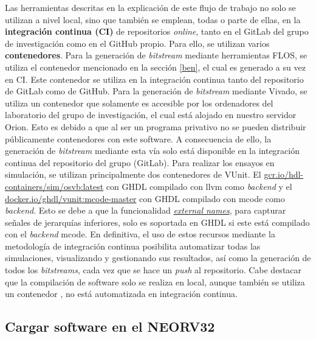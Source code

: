 Las herramientas descritas en la explicación de este flujo de trabajo no solo se utilizan a nivel local, sino que también se emplean, todas o parte de ellas, en la \textbf{integración continua (CI)} de repositorios \textit{online}, tanto en el GitLab del grupo de investigación como en el GitHub propio.
Para ello, se utilizan varios \textbf{contenedores}.
Para la generación de \textit{bitstream} mediante herramientas FLOS, se utiliza el contenedor mencionado en la sección \ref{ben}, el cual es generado a su vez en CI.
Este contenedor se utiliza en la integración continua tanto del repositorio de GitLab como de GitHub.
Para la generación de \textit{bitstream} mediante Vivado, se utiliza un contenedor que solamente es accesible por los ordenadores del laboratorio del grupo de investigación, el cual está alojado en nuestro servidor Orion.
Esto es debido a que al ser un programa privativo no se pueden distribuir públicamente contenedores con este software. A consecuencia de ello, la generación de \textit{bitstream} mediante esta vía solo está disponible en la integración continua del repositorio del grupo (GitLab).
Para realizar los ensayos en simulación, se utilizan principalmente dos contenedores de VUnit.
El \href{https://console.cloud.google.com/gcr/images/hdl-containers/global/sim/osvb}{gcr.io/hdl-containers/sim/osvb:latest} con GHDL compilado con llvm como \textit{backend} y el \href{https://hub.docker.com/layers/ghdl/vunit/mcode-master/images/sha256-e32029c5be70a5fa0fc94bffd15d72fa8b84ad8aaf2dc7cfa8ab8324ef733ed0?context=explore}{docker.io/ghdl/vunit:mcode-master} con GHDL compilado con mcode como \textit{backend}.
Esto se debe a que la funcionalidad \href{https://github.com/stnolting/neorv32/discussions/886}{\textit{external names}}, para capturar señales de jerarquías inferiores, solo es soportada en GHDL si este está compilado con el \textit{backend} mcode.
En definitiva, el uso de estos recursos mediante la metodología de integración continua posibilita automatizar todas las simulaciones, visualizando y gestionando sus resultados, así como la generación de todos los \textit{bitstreams}, cada vez que se hace un \textit{push} al repositorio.
Cabe destacar que la compilación de software solo se realiza en local, aunque también se utiliza un contenedor \cite{gh:sim-conatiner}, no está automatizada en integración continua.

\subsection{Cargar software en el NEORV32}

